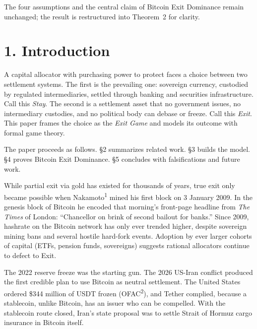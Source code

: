 \documentclass[12pt]{article}
\theoremstyle{definition}
\theoremstyle{remark}
\begin{document}
\smallskip

\noindent The four assumptions and the central claim of Bitcoin Exit Dominance remain unchanged; the result is restructured into Theorem~2 for clarity.

\newpage


\section{1. Introduction}

A capital allocator with purchasing power to protect faces a choice between two settlement systems. The first is the prevailing one: sovereign currency, custodied by regulated intermediaries, settled through banking and securities infrastructure. Call this \emph{Stay}. The second is a settlement asset that no government issues, no intermediary custodies, and no political body can debase or freeze. Call this \emph{Exit}. This paper frames the choice as the \emph{Exit Game} and models its outcome with formal game theory.

The paper proceeds as follows. \S2 summarizes related work. \S3 builds the model. \S4 proves Bitcoin Exit Dominance. \S5 concludes with falsifications and future work.

While partial exit via gold has existed for thousands of years, true exit only became possible when Nakamoto\textsuperscript{1} mined his first block on 3 January 2009. In the genesis block of Bitcoin he encoded that morning's front-page headline from \emph{The Times} of London: ``Chancellor on brink of second bailout for banks.'' Since 2009, hashrate on the Bitcoin network has only ever trended higher, despite sovereign mining bans and several hostile hard-fork events. Adoption by ever larger cohorts of capital (ETFs, pension funds, sovereigns) suggests rational allocators continue to defect to Exit.

The 2022 reserve freeze was the starting gun. The 2026 US-Iran conflict produced the first credible plan to use Bitcoin as neutral settlement. The United States ordered \$344 million of USDT frozen (OFAC\textsuperscript{2}), and Tether complied, because a stablecoin, unlike Bitcoin, has an issuer who can be compelled. With the stablecoin route closed, Iran's state proposal was to settle Strait of Hormuz cargo insurance in Bitcoin itself.
\end{document}
